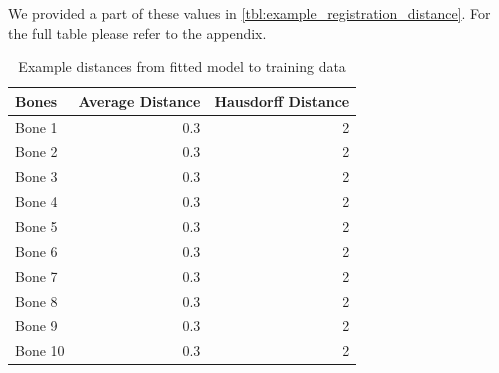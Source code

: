 We provided a part of these values in \autoref{tbl:example_registration_distance}. For the full table please refer to the appendix.

\begin{table}
\centering
\caption{Example distances from fitted model to training data}
\label{tbl:example_registration_distance}
\begin{tabular}{lrr}
\toprule
\textbf{Bones} &
Average Distance &
Hausdorff Distance \\
\midrule
Bone 1& 0.3 & 2 \\
Bone 2& 0.3 & 2 \\
Bone 3& 0.3 & 2 \\
Bone 4& 0.3 & 2 \\
Bone 5& 0.3 & 2 \\
Bone 6& 0.3 & 2 \\
Bone 7& 0.3 & 2 \\
Bone 8& 0.3 & 2 \\
Bone 9& 0.3 & 2 \\
Bone 10& 0.3 & 2 \\
\bottomrule
\end{tabular}
\end{table}

